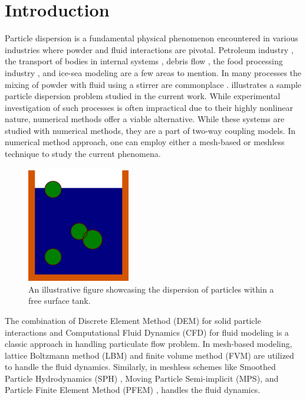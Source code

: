 \documentclass[preprint,12pt]{elsarticle}
\begin{document}


\FloatBarrier%
\section{Introduction}

Particle dispersion is a fundamental physical phenomenon encountered in
various industries where powder and fluid interactions are pivotal.  Petroleum
industry \cite{wang2023developments}, the transport of bodies in internal
systems \cite{Dai2021}, debris flow \cite{Qingyun2022}, the food processing
industry \cite{Karunasena2014}, and ice-sea modeling \cite{Mintu2018} are a
few areas to mention.  In many processes the mixing of powder with fluid using
a stirrer are commonplace \cite{li2022study}.  
illustrates a sample particle dispersion problem studied in the current work.
While experimental investigation of such processes is often impractical due to
their highly nonlinear nature, numerical methods offer a viable alternative.
While these systems are studied with numerical methods, they are a part of
two-way coupling models. In numerical method approach, one can employ either a
mesh-based or meshless technique to study the current phenomena.

\begin{figure}[!htpb]
  \centering
  \includegraphics[width=0.4\textwidth]{images/hs_tank_fluid_with_particles}
  \caption{An illustrative figure showcasing the dispersion of particles within a free surface tank.}
  \label{intro:schematic}
\end{figure}



The combination of Discrete Element Method (DEM) for solid particle
interactions and Computational Fluid Dynamics (CFD) for fluid modeling
is a classic approach in handling particulate flow problem. In
mesh-based modeling, lattice Boltzmann method (LBM)
\cite{xiong2014lbm} and finite volume method (FVM) \cite{kloss2012models} are
utilized to handle the fluid dynamics. Similarly, in meshless schemes like
Smoothed Particle Hydrodynamics (SPH) \cite{peng2021fully},
Moving Particle Semi-implicit (MPS), and Particle Finite Element
Method (PFEM) \cite{li2019modeling, franci2020pfem}, handles the fluid
dynamics.
\end{document}

